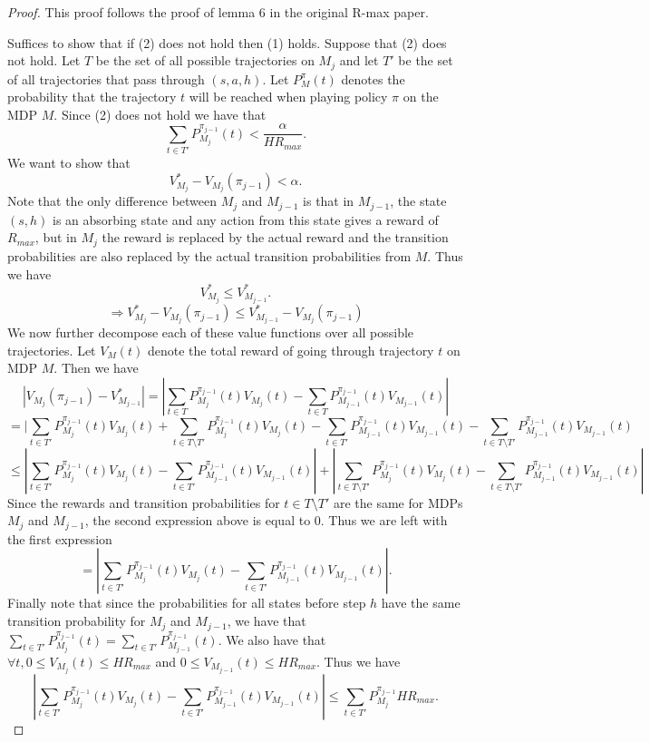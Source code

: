 \documentclass[12pt, letterpaper]{article}
\theoremstyle{definition}
\theoremstyle{remark}
\begin{document}
\begin{proof}[Proof]
    This proof follows the proof of lemma 6 in the original R-max paper.

    Suffices to show that if (2) does not hold then (1) holds. Suppose that (2) does not hold. Let \(T\) be the set of all possible trajectories on \(M_{j}\) and let \(T'\) be the set of all trajectories that pass through \((s, a, h)\). Let \(P_M^{\pi}(t)\) denotes the probability that the trajectory \(t\) will be reached when playing policy \(\pi\) on the MDP \(M\).  Since (2) does not hold we have that
    \[\sum_{t \in T'} P_{M_j}^{\pi_{j-1}}(t) < \frac{\alpha}{H R_{max}}.\]
    We want to show that
    \[V^*_{M_j} - V_{M_j}(\pi_{j-1}) < \alpha.\]
    Note that the only difference between \(M_j\) and \(M_{j-1}\) is that in \(M_{j-1}\), the state \((s, h)\) is an absorbing state and any action from this state gives a reward of \(R_{max}\), but in \(M_j\) the reward is replaced by the actual reward and the transition probabilities are also replaced by the actual transition probabilities from \(M\). Thus we have
    \[V^*_{M_j} \leq V^*_{M_{j-1}}.\]
    \[\Rightarrow V^*_{M_j} - V_{M_j}(\pi_{j-1}) \leq V^*_{M_{j-1}} - V_{M_j}(\pi_{j-1})\]
    We now further decompose each of these value functions over all possible trajectories. Let \(V_{M}(t)\) denote the total reward of going through trajectory \(t\) on MDP \(M\). Then we have
    \[ |V_{M_j}(\pi_{j-1}) - V_{M_{j-1}}^* | = |\sum_{t \in T} P_{M_j}^{\pi_{j-1}}(t) V_{M_j}(t) - \sum_{t \in T} P_{M_{j-1}}^{\pi_{j-1}}(t) V_{M_{j-1}}(t)|\]
    \[= |\sum_{t \in T'} P_{M_j}^{\pi_{j-1}}(t) V_{M_j}(t) + \sum_{t \in T \setminus T'} P_{M_j}^{\pi_{j-1}}(t) V_{M_j}(t) - \sum_{t \in T'} P_{M_{j-1}}^{\pi_{j-1}}(t) V_{M_{j-1}}(t) - \sum_{t \in T \setminus T'} P_{M_{j-1}}^{\pi_{j-1}}(t) V_{M_{j-1}}(t)\]
    \[\leq |\sum_{t \in T'} P_{M_j}^{\pi_{j-1}}(t) V_{M_j}(t) - \sum_{t \in T'} P_{M_{j-1}}^{\pi_{j-1}}(t) V_{M_{j-1}}(t)| + |\sum_{t \in T \setminus T'} P_{M_j}^{\pi_{j-1}}(t) V_{M_j}(t) -  \sum_{t \in T \setminus T'} P_{M_{j-1}}^{\pi_{j-1}}(t) V_{M_{j-1}}(t)|\]
    Since the rewards and transition probabilities for \(t \in T \setminus T'\) are the same for MDPs \(M_j\) and \(M_{j-1}\), the second expression above is equal to 0. Thus we are left with the first expression
    \[= |\sum_{t \in T'} P_{M_j}^{\pi_{j-1}}(t) V_{M_j}(t) - \sum_{t \in T'} P_{M_{j-1}}^{\pi_{j-1}}(t) V_{M_{j-1}}(t)|.\]
    Finally note that since the probabilities for all states before step \(h\) have the same transition probability for \(M_j\) and \(M_{j-1}\), we have that \(\sum_{t \in T'} P_{M_j}^{\pi_{j-1}}(t) = \sum_{t \in T'} P_{M_{j-1}}^{\pi_{j-1}}(t)\). We also have that \(\forall t, 0 \leq V_{M_j}(t) \leq HR_{max}\) and \(0 \leq V_{M_{j-1}}(t) \leq HR_{max}\). Thus we have
    \[|\sum_{t \in T'} P_{M_j}^{\pi_{j-1}}(t) V_{M_j}(t) - \sum_{t \in T'} P_{M_{j-1}}^{\pi_{j-1}}(t) V_{M_{j-1}}(t)| \leq \sum_{t \in T'} P_{M_j}^{\pi_{j-1}} H R_{max}.\]
    

\end{proof}
\end{document}
